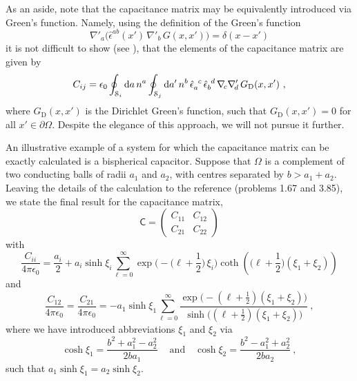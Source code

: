 \documentclass[12pt]{iopart}
\newcommand{\dd}{\partial}
\newcommand{\nab}[1]{\nabla_{\! #1}}
\newcommand{\df}{\mathrm{d}}
\newcommand{\be}{\begin{equation}}
\newcommand{\ee}{\end{equation}}
\newcommand{\mx}[1]{\bm{\mathsf{#1}}}
\newcommand{\0}{\vct{0}}
\theoremstyle{plain} \newtheorem{tm}{Theorem}[section]
\theoremstyle{plain} \newtheorem{lm}[tm]{Lemma}
\theoremstyle{definition} \newtheorem{defn}[tm]{Definition}
\begin{document}
\medskip



As an aside, note that the capacitance matrix may be equivalently introduced via Green's function. Namely, using the definition of the Green's function
\be
\nabla'_{\!a} \big( \hat{\epsilon}^{ab}(x') \, \nabla'_{\!b} \, G(x,x') \big) = \delta(x-x')
\ee
it is not difficult to show (see \cite{SDeRMTN}), that the elements of the capacitance matrix are given by
\be
C_{ij} = \epsilon_0 \oint_{\mathcal{S}_i} \df a \, n^a \oint_{\mathcal{S}_j} \df a' \, n^b \, \tensor{\hat{\epsilon}}{_a^c} \, \tensor{\hat{\epsilon}}{_b^d} \, \nab{c} \nab{d}' \, G_{\mathrm{D}}(x,x') \ ,
\ee
where $G_{\mathrm{D}}(x,x')$ is the Dirichlet Green's function, such that $G_{\mathrm{D}}(x,x') = 0$ for all $x' \in \dd\Omega$. Despite the elegance of this approach, we will not pursue it further.

\medskip

An illustrative example of a system for which the capacitance matrix can be exactly calculated is a bispherical capacitor. Suppose that $\Omega$ is a complement of two conducting balls of radii $a_1$ and $a_2$, with centres separated by $b > a_1 + a_2$. Leaving the details of the calculation to the reference \cite{BT} (problems 1.67 and 3.85), we state the final result for the capacitance matrix,
\be\label{eq:bisph}
\mx{C} = \begin{pmatrix} C_{11} & C_{12} \\ C_{21} & C_{22} \end{pmatrix}
\ee
with
\be
\frac{C_{ii}}{4\pi\epsilon_0} = \frac{a_i}{2} + a_i \sinh \xi_i \sum_{\ell = 0}^\infty \exp\Big( -\big( \ell + \frac{1}{2} \big) \, \xi_i \Big) \coth\left( \big( \ell + \frac{1}{2} \big)(\xi_1 + \xi_2) \right)
\ee
and
\be
\frac{C_{12}}{4\pi\epsilon_0} = \frac{C_{21}}{4\pi\epsilon_0} = -a_1 \sinh \xi_1 \sum_{\ell=0}^\infty \frac{\exp\big( -(\ell + \frac{1}{2})(\xi_1 + \xi_2) \big)}{\sinh\big( (\ell + \frac{1}{2})(\xi_1 + \xi_2) \big)} \ ,
\ee
where we have introduced abbreviations $\xi_1$ and $\xi_2$ via
\be
\cosh \xi_1 = \frac{b^2 + a_1^2 - a_2^2}{2 b a_1} \ \quad \textrm{and} \quad \cosh \xi_2 = \frac{b^2 - a_1^2 + a_2^2}{2 b a_2} \ ,
\ee
such that $a_1 \sinh \xi_1 = a_2 \sinh \xi_2$.

\medskip
\end{document}
